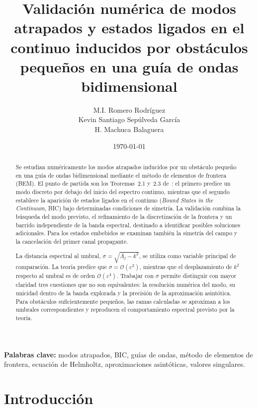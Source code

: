 \documentclass[11pt]{article}
\title{Validación numérica de modos atrapados y estados ligados en el continuo inducidos por obstáculos pequeños en una guía de ondas bidimensional}
\author{M.I. Romero Rodr\'iguez\\
Kevin Santiago Sepúlveda García\\
H. Machuca Balaguera}
\date{\today}
\begin{document}
\maketitle

\begin{abstract}

Se estudian numéricamente los modos atrapados inducidos por un obstáculo pequeño en una guía de ondas bidimensional mediante el método de elementos de frontera (BEM). El punto de partida son los Teoremas~2.1 y~2.3 de~\cite{Zhevandrov2025}: el primero predice un modo discreto por debajo del inicio del espectro continuo, mientras que el segundo establece la aparición de estados ligados en el continuo (\emph{Bound States in the Continuum}, BIC) bajo determinadas condiciones de simetría. La validación combina la búsqueda del modo previsto, el refinamiento de la discretización de la frontera y un barrido independiente de la banda espectral, destinado a identificar posibles soluciones adicionales. Para los estados embebidos se examinan también la simetría del campo y la cancelación del primer canal propagante.

La distancia espectral al umbral,
\(\sigma=\sqrt{\Lambda_j-k^2}\),
se utiliza como variable principal de comparación. La teoría predice que \(\sigma=\mathcal{O}(\varepsilon^2)\), mientras que el desplazamiento de \(k^2\) respecto al umbral es de orden \(\mathcal{O}(\varepsilon^4)\). Trabajar con \(\sigma\) permite distinguir con mayor claridad tres cuestiones que no son equivalentes: la resolución numérica del modo, su unicidad dentro de la banda explorada y la precisión de la aproximación asintótica. Para obstáculos suficientemente pequeños, las ramas calculadas se aproximan a los umbrales correspondientes y reproducen el comportamiento espectral previsto por la teoría.

\end{abstract}

\noindent\textbf{Palabras clave:}
modos atrapados, BIC, guías de ondas, método de elementos de frontera, ecuación de Helmholtz, aproximaciones asintóticas, valores singulares.

\tableofcontents
\newpage

\section{Introducción}
\end{document}
